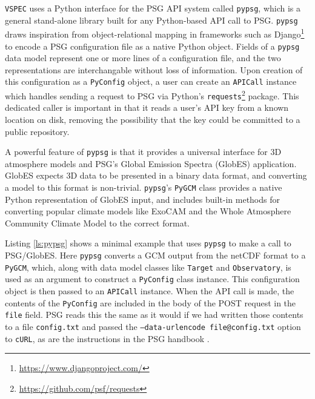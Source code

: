 \documentclass[twocolumn]{aastex631}
\newcommand{\vspec}[1]{\texttt{VSPEC}#1}
\begin{document}
\vspec{} uses a Python interface for the PSG API system called \texttt{pypsg}, which is a general stand-alone library built for any Python-based API call to PSG. \texttt{pypsg} draws inspiration from object-relational mapping in frameworks such as Django\footnote{\url{https://www.djangoproject.com/}} to encode a PSG configuration file as a native Python object. Fields of a \texttt{pypsg} data model represent one or more lines of a configuration file, and the two representations are interchangable without loss of information. Upon creation of this configuration as a \texttt{PyConfig} object, a user can create an \texttt{APICall} instance which handles sending a request to PSG via Python's \texttt{requests}\footnote{\url{https://github.com/psf/requests}} package. This dedicated caller is important in that it reads a user's API key from a known location on disk, removing the possibility that the key could be committed to a public repository.

A powerful feature of \texttt{pypsg} is that it provides a universal interface for 3D atmosphere models and PSG's Global Emission Spectra (GlobES) application.
GlobES expects 3D data to be presented in a binary data format, and converting a model to this format is non-trivial. \texttt{pypsg}'s \texttt{PyGCM} class provides a native Python representation of GlobES input, and includes built-in methods for converting popular climate models like ExoCAM \citep{wolf2022} and the Whole Atmosphere Community Climate Model \citep[WACCM,][]{marsh2013} to the correct format.

Listing \ref{ls:pypsg} shows a minimal example that uses \texttt{pypsg} to make a call to PSG/GlobES. Here \texttt{pypsg} converts a GCM output from the netCDF format to a \texttt{PyGCM}, which, along with data model classes like \texttt{Target} and \texttt{Observatory}, is used as an argument to construct a \texttt{PyConfig} class instance. This configuration object is then passed to an \texttt{APICall} instance. When the API call is made, the contents of the \texttt{PyConfig} are included in the body of the POST request in the \texttt{file} field. PSG reads this the same as it would if we had written those contents to a file \texttt{config.txt} and passed the \texttt{--data-urlencode file@config.txt} option to \texttt{cURL}, as are the instructions in the PSG handbook \citep[pp. 162-163]{villanueva2022}.
\end{document}
